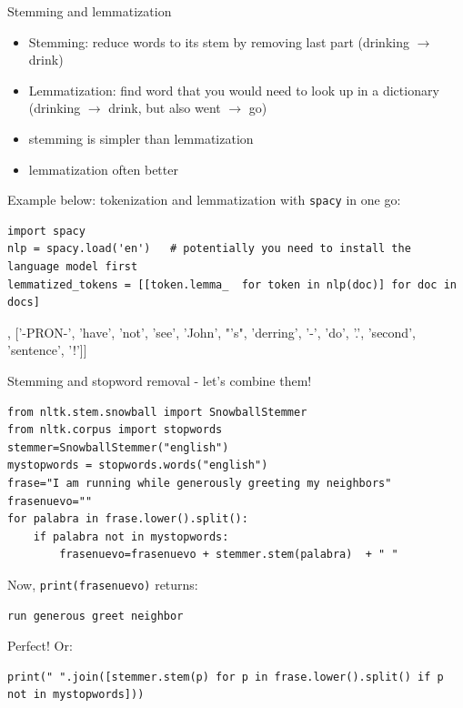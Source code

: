 \documentclass[compress]{beamer}
\begin{document}
\begin{frame}[fragile]{Stemming and lemmatization}
\begin{itemize}
\item Stemming: reduce words to its stem by removing last part (drinking $\rightarrow$ drink)
\item Lemmatization: find word that you would need to look up in a dictionary (drinking $\rightarrow$ drink, but also went $\rightarrow$ go)
\item stemming is simpler than lemmatization
\item lemmatization often better
\end{itemize}
\pause

Example below: tokenization and lemmatization with \texttt{spacy} in one go:
\begin{lstlisting}
import spacy
nlp = spacy.load('en')   # potentially you need to install the language model first
lemmatized_tokens = [[token.lemma_  for token in nlp(doc)] for doc in docs]
\end{lstlisting}
\begin{lstlistingoutputtiny}
[['this', 'be', 'a', 'text'], ['-PRON-', 'have', 'not', 'see', 'John', "'s", 'derring', '-', 'do', '.', 'second', 'sentence', '!']]
\end{lstlistingoutputtiny}
\end{frame}




\begin{frame}[fragile]{Stemming and stopword removal - let's combine them!}
\begin{lstlisting}
from nltk.stem.snowball import SnowballStemmer
from nltk.corpus import stopwords
stemmer=SnowballStemmer("english")
mystopwords = stopwords.words("english")
frase="I am running while generously greeting my neighbors"
frasenuevo=""
for palabra in frase.lower().split():
	if palabra not in mystopwords:
		frasenuevo=frasenuevo + stemmer.stem(palabra)  + " "
\end{lstlisting}
Now, {\tt{print(frasenuevo)}} returns:
\begin{lstlisting}
run generous greet neighbor
\end{lstlisting}
Perfect!
\pause
\small
Or:
\begin{lstlisting}
print(" ".join([stemmer.stem(p) for p in frase.lower().split() if p not in mystopwords]))
\end{lstlisting}

\end{frame}
\end{document}
